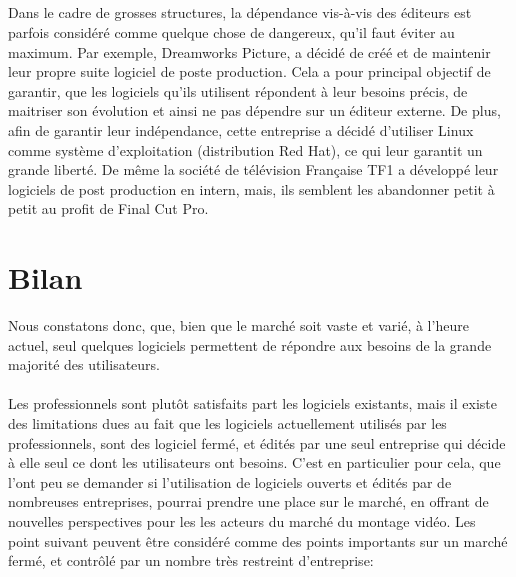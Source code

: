   \subparagraph{}
  Dans le cadre de grosses structures, la dépendance vis-à-vis des éditeurs est parfois considéré comme
  quelque chose de dangereux, qu'il faut éviter au maximum. Par exemple, Dreamworks Picture,
  a décidé de créé et de maintenir leur propre suite logiciel \cite {Dreamworks} de poste
  production. Cela a pour principal objectif de garantir, que les logiciels qu'ils utilisent
  répondent à leur besoins précis, de maitriser son évolution et ainsi ne pas dépendre sur un éditeur
  externe. De plus, afin de garantir leur indépendance, cette entreprise a décidé d'utiliser Linux comme
  système d'exploitation (distribution Red Hat), ce qui leur garantit un grande liberté. De même la société
  de télévision Française TF1 a développé leur logiciels de post production en intern, mais, ils semblent
  les abandonner petit à petit au profit de Final Cut Pro.

\newpage
\section {Bilan}
  Nous constatons donc, que, bien que le marché soit vaste et varié, à l'heure actuel, seul
  quelques logiciels permettent de répondre aux besoins de la grande majorité des utilisateurs.

  \paragraph{}
  Les professionnels sont plutôt satisfaits part les logiciels
  existants, mais il existe des limitations dues au fait que les
  logiciels actuellement utilisés par les professionnels,  sont des
  logiciel fermé, et édités par une seul entreprise qui décide à
  elle seul ce dont les utilisateurs ont besoins. C'est en particulier
  pour cela, que l'ont peu se demander si l'utilisation de logiciels
  ouverts et édités par de nombreuses entreprises, pourrai prendre une
  place sur le marché, en offrant de nouvelles perspectives pour les
  les acteurs du marché du montage vidéo. Les point suivant peuvent
  être considéré comme des points importants sur un marché fermé,
  et contrôlé par un nombre très restreint d'entreprise:
